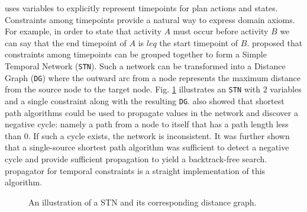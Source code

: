 \eu uses variables to explicitly represent timepoints for plan
actions and states. Constraints among timepoints provide a natural
way to express domain axioms. For example, in order to state that
activity $A$ must occur before activity $B$ we can say that the end
timepoint of $A$ is $leq$ the start timepoint of $B$.
\cite{dechter91} proposed that constraints among timepoints can be
grouped together to form a Simple Temporal Network
(\texttt{STN}). Such a network can be transformed into a Distance
Graph (\texttt{DG}) where the outward arc from a node represents the
maximum distance from the source node to the target node.
Fig. \ref{fig:stn} illustrates an \texttt{STN} with $2$ variables and
a single constraint along with the resulting \texttt{DG}.
\cite{dechter91} also showed that shortest path algorithms could be
used to propagate values in the network and discover a negative cycle:
namely a path from a node to itself that has a path length less than
$0$. If such a cycle exists, the network is inconsistent. It was
further shown that a single-source shortest path algorithm was
sufficient to detect a negative cycle and provide sufficient
propagation to yield a backtrack-free search. \eus propagator for
temporal constraints is a straight implementation of this algorithm.

\begin{figure}[!htb]
  \centering
  \caption{\small An illustration of a STN and its corresponding
    distance graph.}
  \label{fig:stn}
\end{figure}

